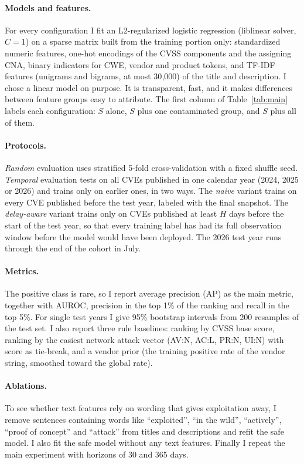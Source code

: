 \documentclass[conference,a4paper]{IEEEtran}
\begin{document}
\paragraph{Models and features.} For every configuration I fit an L2-regularized logistic regression (liblinear solver, $C=1$) on a sparse matrix built from the training portion only: standardized numeric features, one-hot encodings of the CVSS components and the assigning CNA, binary indicators for CWE, vendor and product tokens, and TF-IDF features (unigrams and bigrams, at most 30{,}000) of the title and description. I chose a linear model on purpose. It is transparent, fast, and it makes differences between feature groups easy to attribute. The first column of Table~\ref{tab:main} labels each configuration: $S$ alone, $S$ plus one contaminated group, and $S$ plus all of them.

\paragraph{Protocols.} \emph{Random} evaluation uses stratified 5-fold cross-validation with a fixed shuffle seed. \emph{Temporal} evaluation tests on all CVEs published in one calendar year (2024, 2025 or 2026) and trains only on earlier ones, in two ways. The \emph{naive} variant trains on every CVE published before the test year, labeled with the final snapshot. The \emph{delay-aware} variant trains only on CVEs published at least $H$ days before the start of the test year, so that every training label has had its full observation window before the model would have been deployed. The 2026 test year runs through the end of the cohort in July.

\paragraph{Metrics.} The positive class is rare, so I report average precision (AP) as the main metric, together with AUROC, precision in the top 1\% of the ranking and recall in the top 5\%. For single test years I give 95\% bootstrap intervals from 200 resamples of the test set. I also report three rule baselines: ranking by CVSS base score, ranking by the easiest network attack vector (AV:N, AC:L, PR:N, UI:N) with score as tie-break, and a vendor prior (the training positive rate of the vendor string, smoothed toward the global rate).

\paragraph{Ablations.} To see whether text features rely on wording that gives exploitation away, I remove sentences containing words like ``exploited'', ``in the wild'', ``actively'', ``proof of concept'' and ``attack'' from titles and descriptions and refit the safe model. I also fit the safe model without any text features. Finally I repeat the main experiment with horizons of 30 and 365 days.
\end{document}
